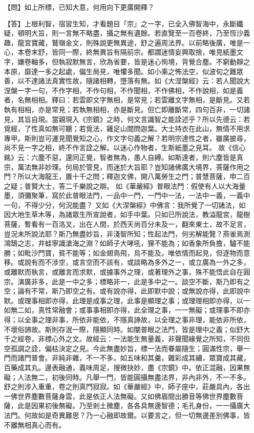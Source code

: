 {\heiti 【問】如上所標，已知大意，何用向下更廣開釋？}

【答】上根利智，宿習生知，才看題目「宗」之一字，已全入佛智海中，永斷纖疑，頓明大旨，則一言無不略盡，攝之無有遺餘。若直覽至一百卷終，乃至恆沙義趣，龍宮寶藏，鷲嶺金文，則殊說更無異途，舒之遍周法界。以前略後廣，唯是一心，本卷末舒，皆同一際，終無異旨有隔前宗。都謂迷情妄興取捨，唯見紙墨文字，嫌卷軸多，但執寂默無言，欣為省要，皆是迷心徇境，背覺合塵。不窮動靜之本原，靡達一多之起處，偏生局見，唯懼多聞。如小乘之怖法空，似波旬之難眾善，以不達諸法真實性故，隨諸相轉，墮落有無。如《大涅槃經》云：若人聞說大涅槃一字一句，不作字相，不作句相，不作聞相，不作佛相，不作說相，如是義者，名無相相。釋曰：若雲即文字無相，是常見；若雲離文字無相，是斷見。又若執有相相，亦是常見；若執無相相，亦是斷見。但亡即離斷常，四句百非，一切諸見，其旨自現。當親現入《宗鏡》之時，何文言識智之能詮述乎？所以先德云：若覓經，了性真如無可聽；若覓法，雞足山間問迦葉。大士持衣在此山，無情不用求專甲。斯則豈可運見聞覺知之心，作文字句義之解？若明宗達性之者，雖廣披尋，尚不見一字之相，終不作言詮之解。以迷心作物者，生斯紙墨之見耳。
故《信心銘》云：{\kaishu 六塵不惡，還同正覺，智者無為，愚人自縛}。如斯達者，則六塵皆是真宗，萬法無非妙理。何局於管見，而迷於大旨耶？豈知諸佛廣大境界，菩薩作用之門？所以大海龍王，置十千之問；釋迦文佛，開八萬勞生之門；普慧菩薩，申二百之疑；普賢大士，答二千樂說之辯。
如《華嚴經》普眼法門：{\kaishu 假使有人以大海量墨，須彌聚筆，寫於此普眼法門，一品中一門，一門中一法，一法中一義，一義中一句，不得少分，何況能盡？}
又如《大涅槃經》中佛言：{\kaishu 我所覺了一切諸法，如因大地生草木等，為諸眾生所宣說者，如手中葉。}只如已所說法，教溢龍宮，龍樹菩薩，暫看有一百洛叉，出在人間，於西天尚百分未及一，翻來東土，故不足言，豈況未所說法耶？斯乃無盡妙旨，非淺智所知；性起法門，何劣解能覽？燕雀焉測鴻鵠之志，井蛙寧識滄海之淵？如師子大哮吼，狸不能為；如香象所負擔，驢不能勝；如毗沙門寶，貧不能等；如金翅鳥飛，烏不能及。唯依情而起見，但逐物而意移。或說有而不涉空，或言空而不該有，或談略為多外之一，或立廣為一外之多，或離默而執言，或離言而求默，或據事外之理，或著理外之事，殊不能悟此自在圓宗。演廣非多，此是一中之多；標略非一，此是多中之一。談空不斷，斯乃即有之空；論有不常，斯乃即空之有。或有說亦得，此即默中說；或無說亦得，此即說中默。或理事相即亦得，此理是成事之理，此事是顯理之事；或理理相即亦得，以一如無二如，真性常融會；或事事相即亦得，此全理之事，一一無礙；或理事不即亦得；以全事之理非事，所依非能依，不隱真諦故，以全理之事非理，能依非所依，不壞俗諦故。斯則存泯一際，隱顯同時。如闡普眼之法門，皆是理中之義；似舒大千之經卷，非標心外之文。故經云：一法能生無量義，非聲聞緣覺之所知，不同但空孤調之詮，偏枯決定之見。今此無盡妙旨，標一法而眷屬隨生；圓滿性宗，舉一門而諸門普會。非純非雜，不一不多。如五味和其羹，雜彩成其繡，眾寶成其藏，百藥成其丸。邊表融通，義味周足，搜微抉妙，盡《宗鏡》中。依正混融，因果無礙；人法無二，初後同時。凡舉一門，皆能圓攝無盡法界，非內非外，不一不多。舒之則涉入重重，卷之則真門寂寂。如《華嚴經》中，師子座中，莊嚴具內，各出一佛世界塵數菩薩身雲，此是依正人法無礙。又如佛眉間出勝音等佛世界塵數菩薩，此是因果初後無礙。乃至剎土微塵，各各具無邊智德；毛孔身份，一一攝廣大法門。何故如是奇異難思？乃一心融即故爾。以要言之，但一切無邊差別佛事，皆不離無相真心而有。
